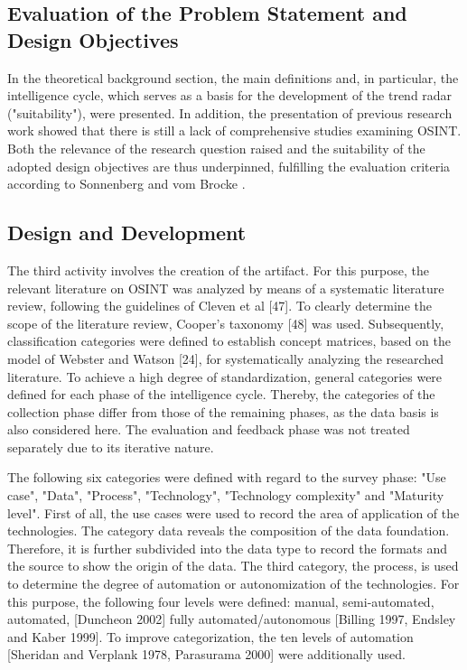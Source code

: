 \documentclass[10pt]{article}
\begin{document}
\subsection{Evaluation of the Problem Statement and Design Objectives}

In the theoretical background section, the main definitions and, in
particular, the intelligence cycle, which serves as a basis for the
development of the trend radar ("suitability"), were presented. In
addition, the presentation of previous research work showed that there
is still a lack of comprehensive studies examining OSINT. Both the
relevance of the research question raised and the suitability of the
adopted design objectives are thus underpinned, fulfilling the
evaluation criteria according to Sonnenberg and vom Brocke \cite{Sonnenberg}.

\subsection{Design and Development}

The third activity involves the creation of the artifact. For this
purpose, the relevant literature on OSINT was analyzed by means of a
systematic literature review, following the guidelines of
Cleven et al [47]. To clearly determine the scope of the literature
review, Cooper's taxonomy [48] was used. Subsequently, classification
categories were defined to establish concept matrices, based on the
model of Webster and Watson [24], for systematically analyzing the
researched literature. To achieve a high degree of standardization,
general categories were defined for each phase of the intelligence
cycle. Thereby, the categories of the collection phase differ from
those of the remaining phases, as the data basis is also considered
here. The evaluation and feedback phase was not treated separately due
to its iterative nature.

The following six categories were defined with regard to the survey
phase: "Use case", "Data", "Process", "Technology", "Technology
complexity" and "Maturity level". First of all, the use cases were
used to record the area of application of the technologies. The
category data reveals the composition of the data foundation. Therefore,
it is further subdivided into the data type to record the formats and
the source to show the origin of the data. The third category, the
process, is used to determine the degree of automation or
autonomization of the technologies. For this purpose, the following
four levels were defined: manual, semi-automated, automated,
[Duncheon 2002] fully automated/autonomous
[Billing 1997, Endsley and Kaber 1999]. To improve categorization,
the ten levels of automation
    [Sheridan and Verplank 1978, Parasurama 2000] were additionally used.
\end{document}
